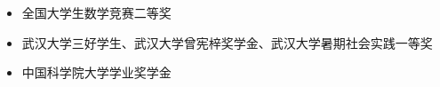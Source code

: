 \documentclass[zh]{resume}
\begin{document}
\begin{itemize}
  \item 全国大学生数学竞赛二等奖
  \item 武汉大学三好学生、武汉大学曾宪梓奖学金、武汉大学暑期社会实践一等奖
  \item 中国科学院大学学业奖学金
\end{itemize}
\end{document}

